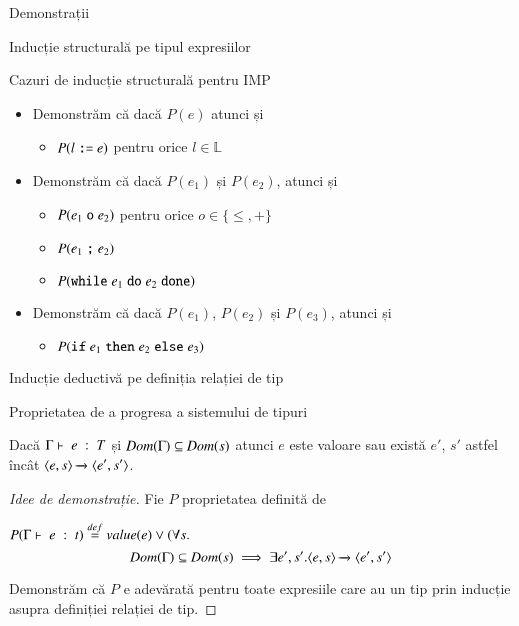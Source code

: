 \documentclass[xcolor=pdftex,romanian,colorlinks,handout]{beamer}
\begin{document}
\begin{section}{Demonstrații}
\begin{subsection}{Inducție structurală pe tipul expresiilor}
\begin{frame}{Cazuri de inducție structurală pentru IMP}{}
\begin{itemize}
\item[]   
Demonstrăm că dacă $P(e)$ atunci și
\begin{itemize}
\item $P(l \mathrel{\text{\ttfamily :=}} e)$ pentru orice $l \in \mathbb{L}$
\end{itemize}
\item[] 
Demonstrăm că dacă $P(e_1)$ și $P(e_2)$, atunci și
\begin{itemize}
\item $P(e_1 \mathrel{\text{\ttfamily o}} e_2)$ pentru orice $o \in \{\leq, +\}$
\item $P(e_1 \mathrel{\text{\ttfamily ;}} e_2)$
\item $P(\mathrel{\text{\ttfamily while}} e_1 \mathrel{\text{\ttfamily do}} e_2 \mathrel{\text{\ttfamily done}})$ 
\end{itemize}
\item[]
Demonstrăm că dacă $P(e_1)$, $P(e_2)$ și $P(e_3)$, atunci și 
\begin{itemize}
\item $P(\mathrel{\text{\ttfamily if}} e_1 \mathrel{\text{\ttfamily then}} e_2 \mathrel{\text{\ttfamily else}} e_3)$ 
\end{itemize}
\end{itemize}
\end{frame}
\end{subsection}


\begin{subsection}{Inducție deductivă pe definiția relației de tip}

\begin{frame}{Proprietatea de a progresa a sistemului de tipuri}
\begin{theorem} Dacă ${\displaystyle \Gamma\vdash \; e \; : \; T}$ și $\mathop{\it Dom}(\Gamma) \subseteq \mathop{\it Dom}(s)$ atunci $e$ este valoare sau există $e'$, $s'$ astfel încât $\displaystyle{\ensuremath {{\langle{e,s}\rangle}} \xrightarrow{} {{\ensuremath \langle{e',s'}\rangle}}}$.
\end{theorem}
\begin{proof}[Idee de demonstrație]
 Fie $P$ proprietatea definită de 

\(P({\displaystyle \Gamma\vdash \; e \; : \; t}) \stackrel{def}{=} \mathop{value}(e) \vee (\forall s.\)
\[ \mathop{\it Dom}(\Gamma) \subseteq \mathop{\it Dom}(s) \implies \exists e',s'. \displaystyle{\ensuremath {{\langle{e,s}\rangle}} \xrightarrow{} {{\ensuremath \langle{e',s'}\rangle}}}\]

Demonstrăm că $P$ e adevărată pentru toate expresiile care au un tip prin inducție asupra definiției relației de tip.
\end{proof}
\end{frame}



\end{subsection}
\end{section}
\end{document}
